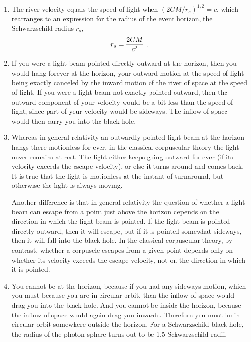 \documentclass[twocolumn,showpacs,preprintnumbers,amsmath,amssymb,prb]{revtex4}
\begin{document}
\begin{enumerate}
\item
The river velocity equals the speed of light when
$\left( {2 G M / r_s} \right)^{1/2} = c$,
which rearranges to an expression for the radius of the event horizon,
the Schwarzschild radius $r_s$,
\[
  r_s
  =
  {2 G M \over c^2}
  \ .
\]

\item
If you were a light beam pointed directly outward at the horizon,
then you would hang forever at the horizon,
your outward motion at the speed of light being exactly
canceled by the inward motion of the river of space at the speed of light.
If you were a light beam not exactly pointed outward,
then the outward component of your velocity would be a bit less than
the speed of light, since part of your velocity would be sideways.
The inflow of space would then carry you into the black hole.

\item
Whereas in general relativity
an outwardly pointed light beam at the horizon hangs there motionless for ever,
in the classical corpuscular theory the light never remains at rest.
The light either keeps going outward for ever
(if its velocity exceeds the escape velocity),
or else it turns around and comes back.
It is true that the light is motionless at the instant of turnaround,
but otherwise the light is always moving.

Another difference is that
in general relativity the question of
whether a light beam can escape from a point just above the horizon
depends on the direction in which the light beam is pointed.
If the light beam is pointed directly outward,
then it will escape, but if it is pointed somewhat sideways,
then it will fall into the black hole.
In the classical corpuscular theory,
by contrast, whether a corpuscle escapes from a given point
depends only on whether its velocity exceeds the escape velocity,
not on the direction in which it is pointed.


\item
You cannot be at the horizon,
because if you had any sideways motion,
which you must because you are in circular orbit,
then the inflow of space would drag you into the black hole.
And you cannot be inside the horizon,
because the inflow of space would again drag you inwards.
Therefore you must be in circular orbit somewhere outside the horizon.
For a Schwarzschild black hole,
the radius of the photon sphere turns out to be 1.5 Schwarzschild radii.


\end{enumerate}
\end{document}
